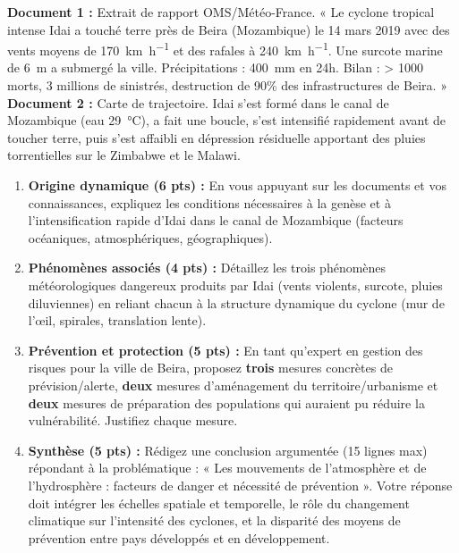 \documentclass[11pt]{article}
\newcounter{popsec}
\newcounter{popsub}
\newcommand{\courssub}[1]{%
  \stepcounter{popsub}%
  \par\vspace{9pt}\noindent{\popxbold\fontsize{11.5}{13}\selectfont\color{popink}{\color{poporange}\thepopsec.\thepopsub}\hspace{6pt}#1}\par\nopagebreak\vspace{4pt}
}
\begin{document}
\courssub{Je me prépare au Probatoire}

\begin{exercice}
\textbf{Document 1 :} Extrait de rapport OMS/Météo-France. « Le cyclone tropical intense Idai a touché terre près de Beira (Mozambique) le 14 mars 2019 avec des vents moyens de \SI{170}{\kilo\meter\per\hour} et des rafales à \SI{240}{\kilo\meter\per\hour}. Une surcote marine de \SI{6}{\meter} a submergé la ville. Précipitations : \SI{400}{\milli\meter} en 24h. Bilan : > 1000 morts, 3 millions de sinistrés, destruction de 90\% des infrastructures de Beira. »
\textbf{Document 2 :} Carte de trajectoire. Idai s'est formé dans le canal de Mozambique (eau \SI{29}{\celsius}), a fait une boucle, s'est intensifié rapidement avant de toucher terre, puis s'est affaibli en dépression résiduelle apportant des pluies torrentielles sur le Zimbabwe et le Malawi.
\begin{enumerate}
    \item \textbf{Origine dynamique (6 pts) :} En vous appuyant sur les documents et vos connaissances, expliquez les conditions nécessaires à la genèse et à l'intensification rapide d'Idai dans le canal de Mozambique (facteurs océaniques, atmosphériques, géographiques).
    \item \textbf{Phénomènes associés (4 pts) :} Détaillez les trois phénomènes météorologiques dangereux produits par Idai (vents violents, surcote, pluies diluviennes) en reliant chacun à la structure dynamique du cyclone (mur de l'œil, spirales, translation lente).
    \item \textbf{Prévention et protection (5 pts) :} En tant qu'expert en gestion des risques pour la ville de Beira, proposez \textbf{trois} mesures concrètes de prévision/alerte, \textbf{deux} mesures d'aménagement du territoire/urbanisme et \textbf{deux} mesures de préparation des populations qui auraient pu réduire la vulnérabilité. Justifiez chaque mesure.
    \item \textbf{Synthèse (5 pts) :} Rédigez une conclusion argumentée (15 lignes max) répondant à la problématique : « Les mouvements de l'atmosphère et de l'hydrosphère : facteurs de danger et nécessité de prévention ». Votre réponse doit intégrer les échelles spatiale et temporelle, le rôle du changement climatique sur l'intensité des cyclones, et la disparité des moyens de prévention entre pays développés et en développement.
\end{enumerate}
\end{exercice}
\end{document}
